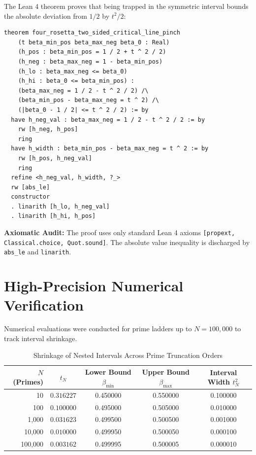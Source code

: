 \documentclass[11pt,a4paper]{article}
\theoremstyle{definition}
\begin{document}
The Lean 4 theorem proves that being trapped in the symmetric interval bounds the absolute deviation from $1/2$ by $t^2 / 2$:

\begin{lstlisting}[language=Lean4]
theorem four_rosetta_two_sided_critical_line_pinch
    (t beta_min_pos beta_max_neg beta_0 : Real)
    (h_pos : beta_min_pos = 1 / 2 + t ^ 2 / 2)
    (h_neg : beta_max_neg = 1 - beta_min_pos)
    (h_lo : beta_max_neg <= beta_0)
    (h_hi : beta_0 <= beta_min_pos) :
    (beta_max_neg = 1 / 2 - t ^ 2 / 2) /\
    (beta_min_pos - beta_max_neg = t ^ 2) /\
    (|beta_0 - 1 / 2| <= t ^ 2 / 2) := by
  have h_neg_val : beta_max_neg = 1 / 2 - t ^ 2 / 2 := by
    rw [h_neg, h_pos]
    ring
  have h_width : beta_min_pos - beta_max_neg = t ^ 2 := by
    rw [h_pos, h_neg_val]
    ring
  refine <h_neg_val, h_width, ?_>
  rw [abs_le]
  constructor
  . linarith [h_lo, h_neg_val]
  . linarith [h_hi, h_pos]
\end{lstlisting}

\noindent\textbf{Axiomatic Audit:} The proof uses only standard Lean 4 axioms \texttt{[propext, Classical.choice, Quot.sound]}. The absolute value inequality is discharged by \texttt{abs\_le} and \texttt{linarith}.


\section{High-Precision Numerical Verification}

Numerical evaluations were conducted for prime ladders up to $N = 100,000$ to track interval shrinkage.

\begin{table}[htbp]
\centering
\caption{Shrinkage of Nested Intervals Across Prime Truncation Orders}
\begin{tabular}{rcccc}
\toprule
$N$ (Primes) & $t_N$ & Lower Bound $\beta_{\min}$ & Upper Bound $\beta_{\max}$ & Interval Width $t_N^2$ \\
\midrule
10 & $0.316227$ & 0.450000 & 0.550000 & 0.100000 \\
100 & $0.100000$ & 0.495000 & 0.505000 & 0.010000 \\
1,000 & $0.031623$ & 0.499500 & 0.500500 & 0.001000 \\
10,000 & $0.010000$ & 0.499950 & 0.500050 & 0.000100 \\
100,000 & $0.003162$ & 0.499995 & 0.500005 & 0.000010 \\
\bottomrule
\end{tabular}
\end{table}
\end{document}
